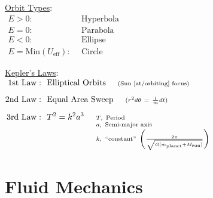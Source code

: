 \documentclass[12pt]{article}
\begin{document}
\vspace{20pt}\noindent
\begin{minipage}[t]{.44\textwidth}
    \underline{Orbit Types}:\\[10pt]
    \(\begin{aligned}
        E > 0: & \ \ \text{Hyperbola} \\[5pt]
        E = 0: & \ \ \text{Parabola}\\[10pt]
        E < 0: & \ \ \text{Ellipse}\\[5pt]
        E = \text{Min}(U_\text{eff}): & \ \ \text{Circle}
    \end{aligned}\)    
\end{minipage}
\begin{minipage}[t]{.49\textwidth}
    \underline{Kepler's Laws}:\\[10pt]
    \(\begin{aligned}
        \text{1st Law}:&\ \ \text{Elliptical Orbits} 
        \hspace{.5cm} \text{\scriptsize(Sun [at/orbiting] focus)}\\[5pt]
        \text{2nd Law}:&\ \ \text{Equal Area Sweep} 
            \hspace{.5cm} {\scriptstyle(r^2 d\theta \ =\ \frac{l}{m} dt)}\\[5pt]
        \text{3rd Law}:&\ \ T^2 = k^2a^3 
            \hspace{.5cm} {\scriptsize \begin{aligned}[t]
                &T,\ \text{Period}\\[-5pt]
                &a,\ \text{Semi-major axis}\\[-3pt]
                &k,\ \text{``constant''} \ \left( \tfrac{2\pi}{\sqrt{G[m_\text{planet} + M_\text{sun}]}} \right)
            \end{aligned}}
    \end{aligned}\)
\end{minipage}

\vspace{10pt}\noindent
\section{Fluid Mechanics}
\end{document}
